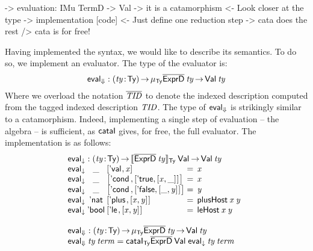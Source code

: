 \begin{wstructure}
    -> evaluation: IMu TermD -> Val
        -> it is a catamorphism
            <- Look closer at the type
        -> implementation [code]
            <- Just define one reduction step
            -> cata does the rest
                /> cata is for free!
\end{wstructure}

\newcommand{\evalH}{\F{eval}_{\green{\Downarrow}}}
\newcommand{\evalOne}{\F{eval}_{\green{\downarrow}}}

Having implemented the syntax, we would like to describe its
semantics. To do so, we implement an evaluator. The type of the
evaluator is:
%
\[
\evalH : \PI{\V{ty}}{\Ty} 
         \IMu{\Ty}{\toIDesc{\HExprD}}{\V{ty}} \To
         \Val{\V{ty}}
\]
%
Where we overload the notation $\toIDesc{\V{TID}}$ to denote the
indexed description computed from the tagged indexed description
$\V{TID}$. The type of $\evalH$ is strikingly similar to a
catamorphism. Indeed, implementing a single step of evaluation -- the
algebra -- is sufficient, as $\cataI$ gives, for free, the full
evaluator. The implementation is as follows:
%
\[\stk{
\evalOne : \PI{\V{ty}}{\Ty} \idescop{\toIDesc{\HExprD}\:\V{ty}}{\Ty}{\Val{\!}}
           \To {\Val{\V{ty}}} \\
\begin{array}{@{}l@{}c@{}l@{\:=\:\:}l}
\evalOne\: & \_\: & \pair{\Eval{\!}}{\V{x}}{}                                             & \V{x} \\
\evalOne\: & \_\: & \pair{\Econd{\!}{\!}{\!}}{\pair{\BoolTrue}{\pair{\V{x}}{\_}{}}{}}{}   & \V{x} \\
\evalOne\: & \_\: & \pair{\Econd{\!}{\!}{\!}}{\pair{\BoolFalse}{\pair{\_}{\V{y}}{}}{}}{}  & \V{y} \\
\evalOne\: & \Enat\: & \pair{\Eplus{\!}{\!}}{\pair{\V{x}}{\V{y}}{}}{}                     & \F{plusHost}\: \V{x}\: \V{y} \\
\evalOne\: & \Ebool\: & \pair{\Ele{\!}{\!}}{\pair{\V{x}}{\V{y}}{}}{}                      & \F{leHost}\: \V{x}\: \V{y} 
\end{array} \\
\\
\evalH : \PI{\V{ty}}{\Ty} 
           \IMu{\Ty}{\toIDesc{\HExprD}}{\V{ty}} \To
           \Val{\V{ty}} \\
\evalH\: \V{ty}\: \V{term} = \cataI_{\Ty}
                                 \toIDesc{\HExprD}\: 
                                 \Val{\!}\: 
                                 \evalOne\: 
                                 \V{ty}\: 
                                 \V{term}
}\]

